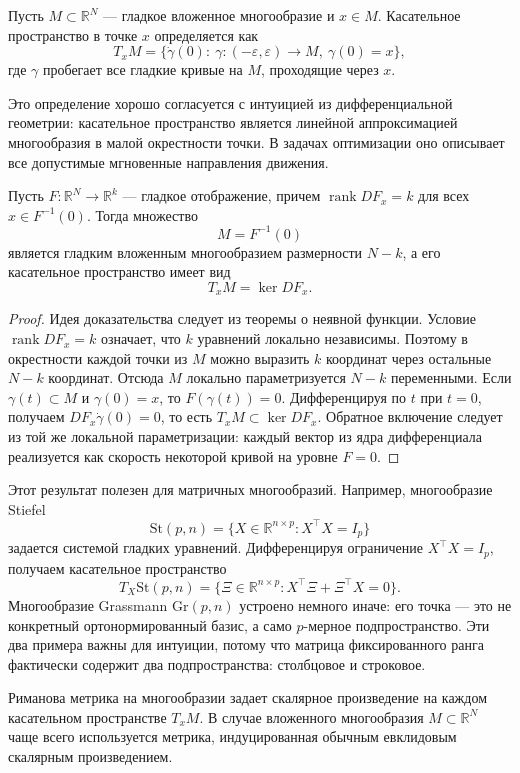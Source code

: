 \documentclass[a4paper,12pt]{article}
\newcommand{\R}{\mathbb{R}}
\newcommand{\rank}{\operatorname{rank}}
\newcommand{\St}{\mathrm{St}}
\newcommand{\Gr}{\mathrm{Gr}}
\begin{document}
\begin{definition}
Пусть $M\subset\R^N$ --- гладкое вложенное многообразие и $x\in M$. Касательное пространство в точке $x$ определяется как
\[
T_xM=\{\dot\gamma(0):\ \gamma:(-\varepsilon,\varepsilon)\to M,\ \gamma(0)=x\},
\]
где $\gamma$ пробегает все гладкие кривые на $M$, проходящие через $x$.
\end{definition}

Это определение хорошо согласуется с интуицией из дифференциальной геометрии: касательное пространство является линейной аппроксимацией многообразия в малой окрестности точки. В задачах оптимизации оно описывает все допустимые мгновенные направления движения.

\begin{proposition}
Пусть $F:\R^N\to\R^k$ --- гладкое отображение, причем $\rank DF_x=k$ для всех $x\in F^{-1}(0)$. Тогда множество
\[
M=F^{-1}(0)
\]
является гладким вложенным многообразием размерности $N-k$, а его касательное пространство имеет вид
\[
T_xM=\ker DF_x.
\]
\end{proposition}

\begin{proof}
Идея доказательства следует из теоремы о неявной функции. Условие $\rank DF_x=k$ означает, что $k$ уравнений локально независимы. Поэтому в окрестности каждой точки из $M$ можно выразить $k$ координат через остальные $N-k$ координат. Отсюда $M$ локально параметризуется $N-k$ переменными. Если $\gamma(t)\subset M$ и $\gamma(0)=x$, то $F(\gamma(t))=0$. Дифференцируя по $t$ при $t=0$, получаем $DF_x\dot\gamma(0)=0$, то есть $T_xM\subset \ker DF_x$. Обратное включение следует из той же локальной параметризации: каждый вектор из ядра дифференциала реализуется как скорость некоторой кривой на уровне $F=0$.
\end{proof}

Этот результат полезен для матричных многообразий. Например, многообразие Stiefel
\[
\St(p,n)=\{X\in\R^{n\times p}:X^\top X=I_p\}
\]
задается системой гладких уравнений. Дифференцируя ограничение $X^\top X=I_p$, получаем касательное пространство
\[
T_X\St(p,n)=\{\Xi\in\R^{n\times p}:X^\top\Xi+\Xi^\top X=0\}.
\]
Многообразие Grassmann $\Gr(p,n)$ устроено немного иначе: его точка --- это не конкретный ортонормированный базис, а само $p$-мерное подпространство. Эти два примера важны для интуиции, потому что матрица фиксированного ранга фактически содержит два подпространства: столбцовое и строковое.

\begin{definition}
Риманова метрика на многообразии задает скалярное произведение на каждом касательном пространстве $T_xM$. В случае вложенного многообразия $M\subset \R^N$ чаще всего используется метрика, индуцированная обычным евклидовым скалярным произведением.
\end{definition}
\end{document}
